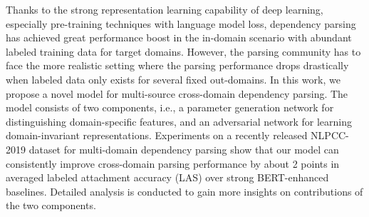 Thanks to the strong representation learning capability of deep learning, especially pre-training techniques with language model loss, dependency parsing has achieved great performance boost in the in-domain scenario with abundant labeled training data for target domains. However, the parsing community has to face the more realistic setting where the parsing performance drops drastically when labeled data only exists for several fixed out-domains. In this work, we propose a novel model for multi-source cross-domain dependency parsing. The model consists of two components, i.e., a parameter generation network for distinguishing domain-specific features, and an adversarial network for learning domain-invariant representations. Experiments on a recently released NLPCC-2019 dataset for multi-domain dependency parsing show that our model can consistently improve cross-domain parsing performance by about 2 points in averaged labeled attachment accuracy (LAS) over strong BERT-enhanced baselines. Detailed analysis is conducted to gain more insights on contributions of the two components.
